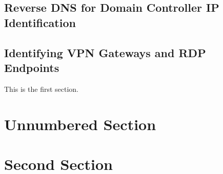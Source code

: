 \documentclass{article}
\begin{document}
\subsection{Reverse DNS for Domain Controller IP Identification}
\subsection{Identifying VPN Gateways and RDP Endpoints}





This is the first section.

\blindtext

\section*{Unnumbered Section}

\blindtext

\section{Second Section}

\blindtext
\end{document}
